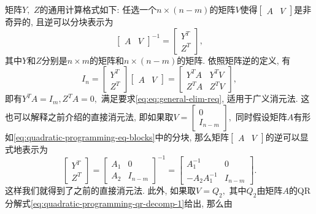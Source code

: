 矩阵$Y,$ $Z$的通用计算格式如下: 任选一个$n \times (n - m)$的矩阵$V$使得$\begin{bmatrix} A & V \end{bmatrix}$是非奇异的, 且逆可以分块表示为
\begin{equation}
\label{eq:quadratic-programming-qr-decomp-general}
\begin{bmatrix} A & V \end{bmatrix}^{-1} = \begin{bmatrix} Y^T \\ Z^T \end{bmatrix},
\end{equation}
其中$Y$和$Z$分别是$n \times m$的矩阵和$n \times (n - m)$的矩阵. 依照矩阵逆的定义, 有
\begin{equation*}
I_n = \begin{bmatrix} Y^T \\ Z^T \end{bmatrix} \begin{bmatrix} A & V \end{bmatrix} = \begin{bmatrix} Y^T A & Y^T V \\ Z^T A & Z^T V \end{bmatrix},
\end{equation*}
即有$Y^T A = I_m, Z^T A = 0,$ 满足要求\eqref{eq:eq:general-elim-req}, 适用于广义消元法. 这也可以解释之前介绍的直接消元法, 即如果取$V = \begin{bmatrix} 0 \\ I_{n - m} \end{bmatrix},$ 同时假设矩阵$A$有形如\eqref{eq:quadratic-programming-eq-blocks}中的分块, 那么矩阵$\begin{bmatrix} A & V \end{bmatrix}$的逆可以显式地表示为
\begin{equation*}
\begin{bmatrix} Y^T \\ Z^T \end{bmatrix} = \begin{bmatrix} A_1 & 0 \\ A_2 & I_{n - m} \end{bmatrix}^{-1} = \begin{bmatrix} A_1^{-1} & 0 \\ -A_2A_1^{-1} & I_{n - m} \end{bmatrix}.
\end{equation*}
这样我们就得到了之前的直接消元法. 此外, 如果取$V = Q_2,$ 其中$Q_2$由矩阵$A$的QR分解式\eqref{eq:quadratic-programming-qr-decomp-1}给出, 那么由
